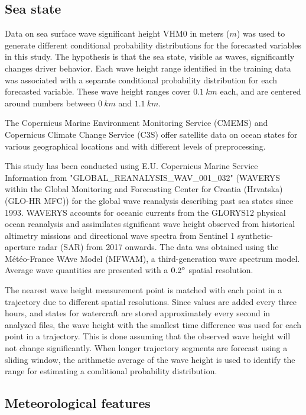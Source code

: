 \documentclass[preprint,12pt]{elsarticle}
\begin{document}
\subsection{Sea state}

Data on sea surface wave significant height VHM0 in meters ($m$) was used to generate different conditional probability distributions for the forecasted variables in this study. The hypothesis is that the sea state, visible as waves, significantly changes driver behavior. Each wave height range identified in the training data was associated with a separate conditional probability distribution for each forecasted variable. These wave height ranges cover $0.1 \ km$ each, and are centered around numbers between $0 \ km$ and $1.1 \ km$.

The Copernicus Marine Environment Monitoring Service (CMEMS) and Copernicus Climate Change Service (C3S) offer satellite data on ocean states for various geographical locations and with different levels of preprocessing.

This study has been conducted using E.U. Copernicus Marine Service Information from "GLOBAL\_REANALYSIS\_WAV\_001\_032" \cite{https://doi.org/10.48670/moi-00022} (WAVERYS within the Global Monitoring and Forecasting Center for Croatia (Hrvatska) (GLO-HR MFC)) for the global wave reanalysis describing past sea states since 1993. WAVERYS accounts for oceanic currents from the GLORYS12 physical ocean reanalysis and assimilates significant wave height observed from historical altimetry missions and directional wave spectra from Sentinel 1 synthetic-aperture radar (SAR) from 2017 onwards. The data was obtained using the Météo-France WAve Model (MFWAM), a third-generation wave spectrum model. Average wave quantities are presented with a $0.2\degree$ spatial resolution.

The nearest wave height measurement point is matched with each point in a trajectory due to different spatial resolutions. Since values are added every three hours, and states for watercraft are stored approximately every second in analyzed files, the wave height with the smallest time difference was used for each point in a trajectory. This is done assuming that the observed wave height will not change significantly. When longer trajectory segments are forecast using a sliding window, the arithmetic average of the wave height is used to identify the range for estimating a conditional probability distribution.

\subsection{Meteorological features}
\end{document}
